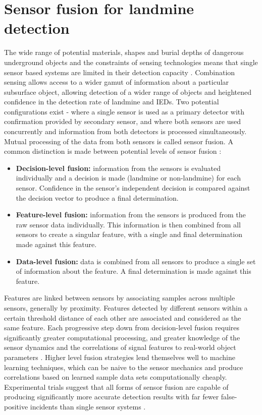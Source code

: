 \documentclass[main.tex]{subfiles}
\begin{document}
\section{Sensor fusion for landmine detection}
The wide range of potential materials, shapes and burial depths of dangerous underground objects and the constraints of sensing technologies means that single sensor based systems are limited in their detection capacity \parencite{Yarovoy2009}. Combination sensing allows access to a wider gamut of information about a particular subsurface object, allowing detection of a wider range of objects and heightened confidence in the detection rate of landmine and IEDs. Two potential configurations exist - where a single sensor is used as a primary detector with confirmation provided by secondary sensor, and where both sensors are used concurrently and information from both detectors is processed simultaneously. Mutual processing of the data from both sensors is called sensor fusion. A common distinction is made between potential levels of sensor fusion \parencite{Yarovoy2009}:
\begin{itemize}
\item \textbf{Decision-level fusion:} information from the sensors is evaluated individually and a decision is made (landmine or non-landmine) for each sensor. Confidence in the sensor's independent decision is compared against the decision vector to produce a final determination.
\item \textbf{Feature-level fusion:} information from the sensors is produced from the raw sensor data individually. This information is then combined from all sensors to create a singular feature, with a single and final determination made against this feature. 
\item \textbf{Data-level fusion:} data is combined from all sensors to produce a single set of information about the feature. A final determination is made against this feature.
\end{itemize}
Features are linked between sensors by associating samples across multiple sensors, generally by proximity. Features detected by different sensors within a certain threshold distance of each other are associated and considered as the same feature. Each progressive step down from decision-level fusion requires significantly greater computational processing, and greater knowledge of the sensor dynamics and the correlations of signal features to real-world object parameters \parencite{Yarovoy2009}. Higher level fusion strategies lend themselves well to machine learning techniques, which can be naive to the sensor mechanics and produce correlations based on learned sample data sets computationally cheaply. Experimental trials suggest that all forms of sensor fusion are capable of producing significantly more accurate detection results with far fewer false-positive incidents than single sensor systems \parencite{Yarovoy2009}.
\end{document}
